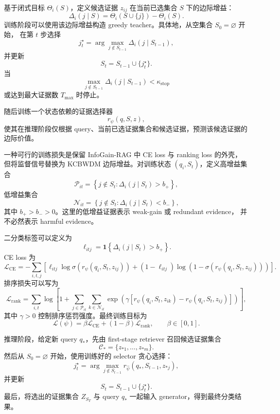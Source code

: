 \documentclass[UTF8,a4paper,12pt,oneside]{ctexart}
\numberwithin{equation}{section}
\begin{document}
基于闭式目标 \(\Theta_i(S)\)，定义候选证据 \(z_{ij}\) 在当前已选集合 \(S\) 下的边际增益：
\[
    \Delta_i(j\mid S)
    =
    \Theta_i(S\cup\{j\})
    -
    \Theta_i(S).
\]
训练阶段可以使用该边际增益构造 greedy teacher。具体地，从空集合 \(S_0=\varnothing\) 开始，
在第 \(t\) 步选择
\[
    j_t^\star
    =
    \arg\max_{j\notin S_{t-1}}
    \Delta_i(j\mid S_{t-1}),
\]
并更新
\[
    S_t
    =
    S_{t-1}\cup\{j_t^\star\}.
\]
当
\[
    \max_{j\notin S_{t-1}}
    \Delta_i(j\mid S_{t-1})
    <
    \kappa_{\mathrm{stop}}
\]
或达到最大证据数 \(T_{\max}\) 时停止。

随后训练一个状态依赖的证据选择器
\[
    r_\psi(q,S,z),
\]
使其在推理阶段仅根据 query、当前已选证据集合和候选证据，预测该候选证据的边际价值。

一种可行的训练损失是保留 InfoGain-RAG 中 CE loss 与 ranking loss 的外壳，
但将监督信号替换为 KCBWDM 边际增益。对训练状态 \((q_i,S_t)\)，定义高增益集合
\[
    \mathcal P_{it}
    =
    \left\{
        j\notin S_t:
        \Delta_i(j\mid S_t)>b_+
    \right\},
\]
低增益集合
\[
    \mathcal N_{it}
    =
    \left\{
        j\notin S_t:
        \Delta_i(j\mid S_t)<b_-
    \right\},
\]
其中 \(b_+>b_->0\)。这里的低增益证据表示 weak-gain 或 redundant evidence，
并不必然表示 harmful evidence。

二分类标签可以定义为
\[
    \ell_{itj}
    =
    \mathbf 1
    \left\{
        \Delta_i(j\mid S_t)>b_+
    \right\}.
\]
CE loss 为
\[
    \mathcal L_{\mathrm{CE}}
    =
    -
    \sum_{i,t,j}
    \left[
        \ell_{itj}
        \log
        \sigma
        \left(
            r_\psi(q_i,S_t,z_{ij})
        \right)
        +
        (1-\ell_{itj})
        \log
        \left(
            1-
            \sigma
            \left(
                r_\psi(q_i,S_t,z_{ij})
            \right)
        \right)
    \right].
\]
排序损失可以写为
\[
    \mathcal L_{\mathrm{rank}}
    =
    \sum_{i,t}
    \log
    \left[
        1+
        \sum_{j\in\mathcal P_{it}}
        \sum_{k\in\mathcal N_{it}}
        \exp
        \left(
            \gamma
            \left[
                r_\psi(q_i,S_t,z_{ik})
                -
                r_\psi(q_i,S_t,z_{ij})
            \right]
        \right)
    \right],
\]
其中 \(\gamma>0\) 控制排序惩罚强度。最终训练目标为
\[
    \mathcal L(\psi)
    =
    \beta
    \mathcal L_{\mathrm{CE}}
    +
    (1-\beta)
    \mathcal L_{\mathrm{rank}},
    \qquad
    \beta\in[0,1].
\]

推理阶段，给定新 query \(q_\ast\)，先由 first-stage retriever 召回候选证据集合
\[
    \mathcal C_\ast
    =
    \{z_{\ast 1},\ldots,z_{\ast m}\}.
\]
然后从 \(S_0=\varnothing\) 开始，使用训练好的 selector 贪心选择：
\[
    j_t^\star
    =
    \arg\max_{j\notin S_{t-1}}
    r_{\widehat\psi}
    (q_\ast,S_{t-1},z_{\ast j}),
\]
并更新
\[
    S_t=S_{t-1}\cup\{j_t^\star\}.
\]
最后，将选出的证据集合 \(Z_{S_T}\) 与 query \(q_\ast\) 一起输入 generator，得到最终分类结果。
\end{document}
